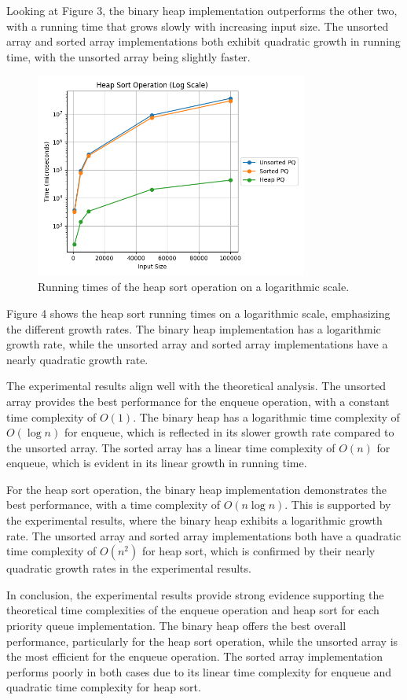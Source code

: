 \documentclass{article}
\begin{document}
Looking at Figure 3, the binary heap implementation outperforms the other two, with a running time that grows slowly with increasing input size. 
The unsorted array and sorted array implementations both exhibit quadratic growth in running time, with the unsorted array being slightly faster.

\begin{figure}[H]
    \centering
    \includegraphics[width=0.8\textwidth]{../plots/heapsort_log.png}
    \caption{Running times of the heap sort operation on a logarithmic scale.}
\end{figure}

Figure 4 shows the heap sort running times on a logarithmic scale, emphasizing the different growth rates. 
The binary heap implementation has a logarithmic growth rate, while the unsorted array and sorted array implementations have a nearly quadratic growth rate.

The experimental results align well with the theoretical analysis. 
The unsorted array provides the best performance for the enqueue operation, with a constant time complexity of $O(1)$. 
The binary heap has a logarithmic time complexity of $O(\log n)$ for enqueue, which is reflected in its slower growth rate compared to the unsorted array. 
The sorted array has a linear time complexity of $O(n)$ for enqueue, which is evident in its linear growth in running time.

For the heap sort operation, the binary heap implementation demonstrates the best performance, with a time complexity of $O(n \log n)$. 
This is supported by the experimental results, where the binary heap exhibits a logarithmic growth rate. 
The unsorted array and sorted array implementations both have a quadratic time complexity of $O(n^2)$ for heap sort, which is confirmed by their nearly quadratic growth rates in the experimental results.

In conclusion, the experimental results provide strong evidence supporting the theoretical time complexities of the enqueue operation and heap sort for each priority queue implementation. 
The binary heap offers the best overall performance, particularly for the heap sort operation, while the unsorted array is the most efficient for the enqueue operation. 
The sorted array implementation performs poorly in both cases due to its linear time complexity for enqueue and quadratic time complexity for heap sort.
\end{document}
